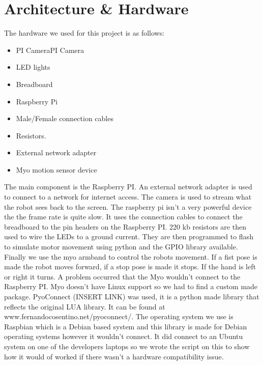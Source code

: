 \documentclass[12pt,a4paper,oneside,openany]{book}
\begin{document}
\chapter*{Architecture \& Hardware}
The hardware we used for this project is as follows:

\begin{itemize}
	\item PI CameraPI Camera 
	\item LED lights
	\item Breadboard
	\item Raspberry Pi
	\item Male/Female connection cables
	\item Resistors.
	\item External network adapter
	\item Myo motion sensor device
\end{itemize}

The main component is the Raspberry PI. An external network adapter is used to connect to a network for internet access. The camera is used to stream what the robot sees back to the screen. The raspberry pi isn’t a very powerful device the the frame rate is quite slow. 
It uses the connection cables to connect the breadboard to the pin headers on the Raspberry PI.  220 kb resistors are then used to wire the LEDs to a ground current. They are then programmed to flash to simulate motor movement using python and the GPIO library available. Finally we use the myo armband to control the robots movement. If a fist pose is made the robot moves forward, if a stop pose is made it stops. If the hand is left or right it turns. A problem occurred that the Myo wouldn’t connect to the Raspberry PI. Myo doesn’t have Linux support so we had to find a custom made package. PyoConnect (INSERT LINK) was used, it is a python made library that reflects the original LUA library. It can be found at www.fernandocosentino.net/pyoconnect/. The operating system we use is Raspbian which is a Debian based system and this library is made for Debian operating systems however it wouldn’t connect. It did connect to an Ubuntu system on one of the developers laptops so we wrote the script on this to show how it would of worked if there wasn’t a hardware compatibility issue.
\end{document}
